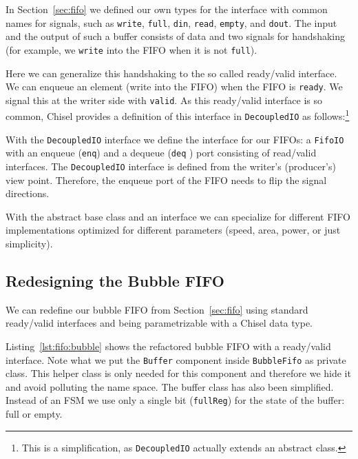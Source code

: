 \documentclass[%
    10pt,
    headinclude, footexclude,
    openright, %
    notitlepage,
    cleardoubleempty,
    headsepline,
    pointlessnumbers,
    bibtotoc, idxtotoc,
    ]{scrbook}
\newcommand{\code}[1]{{\small{\texttt{#1}}}}
\newcommand{\codefoot}[1]{{\footnotesize{\texttt{#1}}}}
\begin{document}

In Section~\ref{sec:fifo} we defined our own types for the interface with common
names for signals, such as \code{write}, \code{full}, \code{din}, \code{read},
\code{empty}, and \code{dout}. The input and the output of such a buffer consists
of data and two signals for handshaking (for example, we \code{write} into the FIFO when
it is not \code{full}).

Here we can generalize this handshaking to the so called ready/valid interface.
We can enqueue an element (write into the FIFO) when the FIFO is \code{ready}.
We signal this at the writer side with \code{valid}.
As this ready/valid interface is so common, Chisel provides a definition
of this interface in \code{DecoupledIO} as follows:\footnote{This is a simplification,
as \codefoot{DecoupledIO} actually extends an abstract class.}


\noindent With the \code{DecoupledIO} interface we define the interface for our FIFOs:
a \code{FifoIO} with an enqueue (\code{enq}) and a dequeue (\code{deq} ) port consisting
of read/valid interfaces.
 The \code{DecoupledIO} interface is defined from the writer's (producer's) view point.
Therefore, the enqueue port of the FIFO needs to flip the signal directions.



With the abstract base class and an interface we can specialize for different
FIFO implementations optimized for different parameters (speed, area, power,
or just simplicity).

\subsection{Redesigning the Bubble FIFO}

We can redefine our bubble FIFO from Section~\ref{sec:fifo} using standard
ready/valid interfaces and being parametrizable with a Chisel data type.


Listing~\ref{lst:fifo:bubble} shows the refactored bubble FIFO with a ready/valid
interface. Note what we put the \code{Buffer} component inside \code{BubbleFifo}
as private class. This helper class is only needed for this component and therefore
we hide it and avoid polluting the name space. The buffer class has also been
simplified. Instead of an FSM we use only a single bit (\code{fullReg}) for
the state of the buffer: full or empty.
\end{document}
